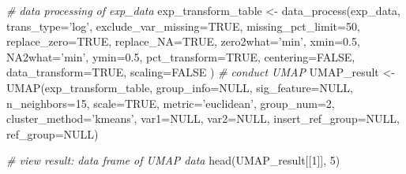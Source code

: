 \documentclass[]{article}
\newcommand{\hlnum}[1]{\textcolor[rgb]{0.816,0.125,0.439}{#1}}%
\newcommand{\hlstr}[1]{\textcolor[rgb]{0.251,0.627,0.251}{#1}}%
\newcommand{\hlcom}[1]{\textcolor[rgb]{0.502,0.502,0.502}{\textit{#1}}}%
\newcommand{\hlstd}[1]{\textcolor[rgb]{0.251,0.251,0.251}{#1}}%
\newcommand{\hlkwc}[1]{\textcolor[rgb]{0.251,0.251,0.251}{#1}}%
\newcommand{\hlkwd}[1]{\textcolor[rgb]{0.878,0.439,0.125}{#1}}%
\newenvironment{Shaded}{\begin{myshaded}}{\end{myshaded}}
\newcommand{\KeywordTok}[1]{\hlkwd{#1}}
\newcommand{\DataTypeTok}[1]{\hlkwc{#1}}
\newcommand{\DecValTok}[1]{\hlnum{#1}}
\newcommand{\FloatTok}[1]{\hlnum{#1}}
\newcommand{\StringTok}[1]{\hlstr{#1}}
\newcommand{\CommentTok}[1]{\hlcom{#1}}
\newcommand{\OtherTok}[1]{{#1}}
\newcommand{\NormalTok}[1]{\hlstd{#1}}
\begin{document}
\begin{Shaded}
\begin{Highlighting}[]
\CommentTok{# data processing of exp_data}
\NormalTok{exp_transform_table <-}\StringTok{ }\KeywordTok{data_process}\NormalTok{(exp_data, }\DataTypeTok{trans_type=}\StringTok{'log'}\NormalTok{,}
                                    \DataTypeTok{exclude_var_missing=}\OtherTok{TRUE}\NormalTok{,}
                                    \DataTypeTok{missing_pct_limit=}\DecValTok{50}\NormalTok{,}
                                    \DataTypeTok{replace_zero=}\OtherTok{TRUE}\NormalTok{, }\DataTypeTok{replace_NA=}\OtherTok{TRUE}\NormalTok{,}
                                    \DataTypeTok{zero2what=}\StringTok{'min'}\NormalTok{, }\DataTypeTok{xmin=}\FloatTok{0.5}\NormalTok{,}
                                    \DataTypeTok{NA2what=}\StringTok{'min'}\NormalTok{, }\DataTypeTok{ymin=}\FloatTok{0.5}\NormalTok{,}
                                    \DataTypeTok{pct_transform=}\OtherTok{TRUE}\NormalTok{, }\DataTypeTok{centering=}\OtherTok{FALSE}\NormalTok{,}
                                    \DataTypeTok{data_transform=}\OtherTok{TRUE}\NormalTok{, }\DataTypeTok{scaling=}\OtherTok{FALSE}\NormalTok{ )}
\CommentTok{# conduct UMAP}
\NormalTok{UMAP_result <-}\StringTok{ }\KeywordTok{UMAP}\NormalTok{(exp_transform_table, }\DataTypeTok{group_info=}\OtherTok{NULL}\NormalTok{,}
                    \DataTypeTok{sig_feature=}\OtherTok{NULL}\NormalTok{, }\DataTypeTok{n_neighbors=}\DecValTok{15}\NormalTok{,}
                    \DataTypeTok{scale=}\OtherTok{TRUE}\NormalTok{, }\DataTypeTok{metric=}\StringTok{'euclidean'}\NormalTok{, }\DataTypeTok{group_num=}\DecValTok{2}\NormalTok{,}
                    \DataTypeTok{cluster_method=}\StringTok{'kmeans'}\NormalTok{, }\DataTypeTok{var1=}\OtherTok{NULL}\NormalTok{, }\DataTypeTok{var2=}\OtherTok{NULL}\NormalTok{,}
                    \DataTypeTok{insert_ref_group=}\OtherTok{NULL}\NormalTok{, }\DataTypeTok{ref_group=}\OtherTok{NULL}\NormalTok{)}

\CommentTok{# view result: data frame of UMAP data}
\KeywordTok{head}\NormalTok{(UMAP_result[[}\DecValTok{1}\NormalTok{]], }\DecValTok{5}\NormalTok{)}
\end{Highlighting}
\end{Shaded}


  \providecommand{\huxb}[2]{\arrayrulecolor[RGB]{#1}\global\arrayrulewidth=#2pt}
  \providecommand{\huxvb}[2]{\color[RGB]{#1}\vrule width #2pt}
  \providecommand{\huxtpad}[1]{\rule{0pt}{#1}}
  \providecommand{\huxbpad}[1]{\rule[-#1]{0pt}{#1}}
\end{document}
